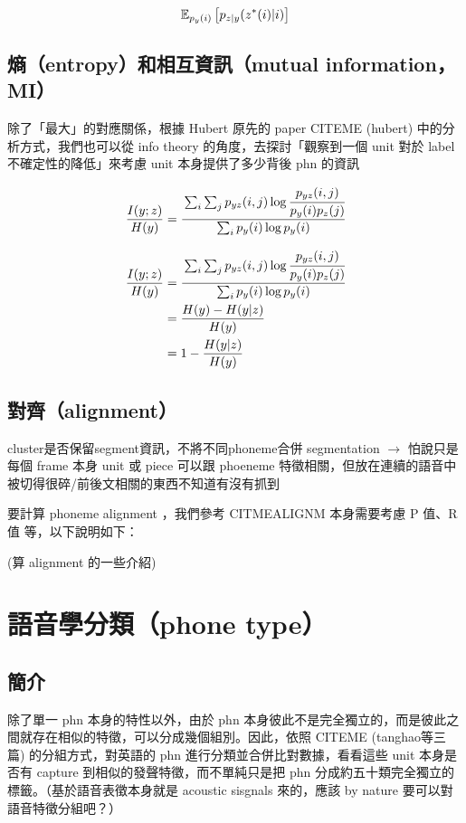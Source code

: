 $$\mathbb{E}_{p_y(i)}\left[p_{z|y}(z^*(i)|i) \right]$$

\subsection{熵（entropy）和相互資訊（mutual information，MI）}

除了「最大」的對應關係，根據 Hubert 原先的 paper CITEME (hubert) 中的分析方式，我們也可以從 info theory 的角度，去探討「觀察到一個 unit 對於 label 不確定性的降低」來考慮 unit 本身提供了多少背後 phn 的資訊

$$\frac{I(y;z)}{H(y)}=\cfrac{\sum_i \sum_j p_{yz}(i, j) \log \cfrac{p_{yz}(i, j)}{p_y(i)p_z(j)}}{\sum_i p_y(i) \log p_y(i)}$$

\begin{align}
\frac{I(y;z)}{H(y)}&=\cfrac{\sum_i \sum_j p_{yz}(i, j) \log \cfrac{p_{yz}(i, j)}{p_y(i)p_z(j)}}{\sum_i p_y(i) \log p_y(i)} \\
&=\frac{H(y)-H(y|z)}{H(y)} \\
&=1-\frac{H(y|z)}{H(y)}
\end{align}



\subsection{對齊（alignment）}
cluster是否保留segment資訊，不將不同phoneme合併
segmentation $\rightarrow$
怕說只是每個 frame 本身 unit 或 piece 可以跟 phoeneme 特徵相關，但放在連續的語音中被切得很碎/前後文相關的東西不知道有沒有抓到

要計算 phoneme alignment ，我們參考 CITMEALIGNM 本身需要考慮 P 值、R 值 等，以下說明如下：

(算 alignment 的一些介紹)



\section{語音學分類（phone type）}

\subsection{簡介}

除了單一 phn 本身的特性以外，由於 phn 本身彼此不是完全獨立的，而是彼此之間就存在相似的特徵，可以分成幾個組別。因此，依照 CITEME (tanghao等三篇) 的分組方式，對英語的 phn 進行分類並合併比對數據，看看這些 unit 本身是否有 capture 到相似的發聲特徵，而不單純只是把 phn 分成約五十類完全獨立的標籤。（基於語音表徵本身就是 acoustic sisgnals 來的，應該 by nature 要可以對語音特徵分組吧？）

